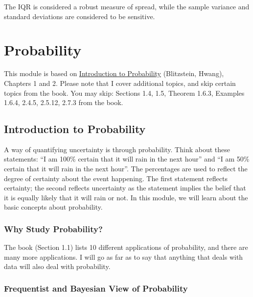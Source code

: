 \documentclass[
]{book}
\begin{document}
The IQR is considered a robust measure of spread, while the sample variance and standard deviations are considered to be sensitive.

\hypertarget{probability}{%
\chapter{Probability}\label{probability}}

This module is based on \href{https://stat110.hsites.harvard.edu/}{Introduction to Probability} (Blitzstein, Hwang), Chapters 1 and 2. Please note that I cover additional topics, and skip certain topics from the book. You may skip: Sections 1.4, 1.5, Theorem 1.6.3, Examples 1.6.4, 2.4.5, 2.5.12, 2.7.3 from the book.

\hypertarget{introduction-to-probability}{%
\section{Introduction to Probability}\label{introduction-to-probability}}

A way of quantifying uncertainty is through probability. Think about these statements: ``I am 100\% certain that it will rain in the next hour'' and ``I am 50\% certain that it will rain in the next hour''. The percentages are used to reflect the degree of certainty about the event happening. The first statement reflects certainty; the second reflects uncertainty as the statement implies the belief that it is equally likely that it will rain or not. In this module, we will learn about the basic concepts about probability.

\hypertarget{why-study-probability}{%
\subsection{Why Study Probability?}\label{why-study-probability}}

The book (Section 1.1) lists 10 different applications of probability, and there are many more applications. I will go as far as to say that anything that deals with data will also deal with probability.

\hypertarget{frequentist-and-bayesian-view-of-probability}{%
\subsection{Frequentist and Bayesian View of Probability}\label{frequentist-and-bayesian-view-of-probability}}
\end{document}
